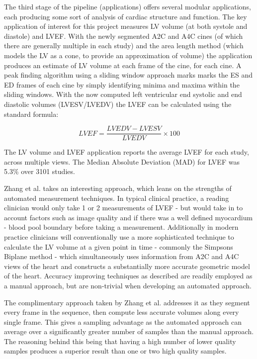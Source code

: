 The third stage of the pipeline (applications) offers several modular
applications, each producing some sort of analysis of cardiac structure and
function. The key application of interest for this project measures LV volume
(at both systole and diastole) and LVEF. With the newly segmented A2C and A4C
cines (of which there are generally multiple in each study) and the area length
method (which models the LV as a cone, to provide an approximation of volume)
the application produces an estimate of LV volume at each frame of the cine, for
each cine. A peak finding algorithm using a sliding window approach marks marks
the ES and ED frames of each cine by simply identifying minima and maxima within
the sliding windows. With the now computed left ventricular end systolic and end
diastolic volumes (LVESV/LVEDV) the LVEF can be calculated using the standard
formula: \newline

\begin{equation}
        LVEF = \frac{LVEDV - LVESV}{LVEDV} \times 100
\end{equation} \newline

The LV volume and LVEF application reports the average LVEF for each study,
across multiple views. The Median Absolute Deviation (MAD) for LVEF was
5.3\% over 3101 studies. \newline

Zhang et al. takes an interesting approach, which leans on the strengths of
automated measurement techniques. In typical clinical practice, a reading
clinician would only take 1 or 2 measurements of LVEF - but would take in to
account factors such as image quality and if there was a well defined myocardium
- blood pool boundary before taking a measurement. Additionally in modern
practice clinicians will conventionally use a more sophisticated technique to
calculate the LV volume at a given point in time - commonly the Simpsons Biplane
method - which simultaneously uses information from A2C and A4C views of the
heart and constructs a substantially more accurate geometric model of the heart.
Accuracy improving techniques as described are readily employed as a manual
approach, but are non-trivial when developing an automated approach. \newline

The complimentary approach taken by Zhang et al. addresses it as they segment
every frame in the sequence, then compute less accurate volumes along every single
frame. This gives a sampling advantage as the automated approach can average over a
significantly greater number of samples than the manual approach. The reasoning
behind this being that having a high number of lower quality samples produces a
superior result than one or two high quality samples. \newline


